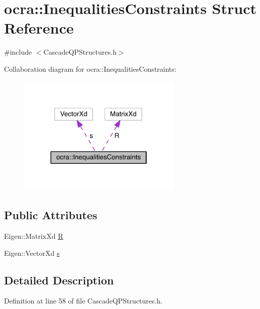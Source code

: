 \hypertarget{structocra_1_1InequalitiesConstraints}{}\section{ocra\+:\+:Inequalities\+Constraints Struct Reference}
\label{structocra_1_1InequalitiesConstraints}


{\ttfamily \#include $<$Cascade\+Q\+P\+Structures.\+h$>$}



Collaboration diagram for ocra\+:\+:Inequalities\+Constraints\+:\nopagebreak
\begin{figure}[H]
\begin{center}
\leavevmode
\includegraphics[width=222pt]{dd/de6/structocra_1_1InequalitiesConstraints__coll__graph}
\end{center}
\end{figure}
\subsection*{Public Attributes}
\begin{DoxyCompactItemize}
\item 
Eigen\+::\+Matrix\+Xd \hyperlink{structocra_1_1InequalitiesConstraints_a855a07da37932011602005e3af25aa76}{R}
\item 
Eigen\+::\+Vector\+Xd \hyperlink{structocra_1_1InequalitiesConstraints_a26db4bbe606a537c1dedbc30a2ca8f36}{s}
\end{DoxyCompactItemize}


\subsection{Detailed Description}


Definition at line 58 of file Cascade\+Q\+P\+Structures.\+h.



